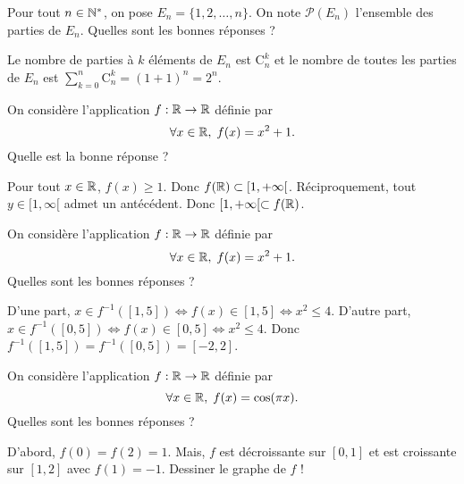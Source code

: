 \begin{question}
Pour tout $n\in \mathbb{N} ^*$, on pose $E_n=\{1,2,\dots ,n\}$. On note $\mathscr{P}(E_n)$ l'ensemble des parties de $E_n$. Quelles sont les bonnes réponses ?
\begin{answers}  
\end{answers}
\begin{explanations}
Le nombre de parties à $k$ éléments de $E_n$ est $\mathrm{C}^k_n$ et le nombre de toutes les parties de $E_n$ est $\displaystyle \sum _{k=0}^n\mathrm{C}^k_n=(1+1)^n=2^n$.
\end{explanations}
\end{question}


\begin{question}
On considère l'application $f:\mathbb{R}\to \mathbb{R}$ définie par
$$\forall x\in \mathbb{R},\; f(x)=x^2+1.$$
Quelle est la bonne réponse ?
\begin{answers}  
    \bad{$f(\Rr)=[0,+\infty [$}
    \bad{$f(\Rr)=]1,+\infty [$}
    \good{$f(\Rr)=[1,+\infty [$}
\end{answers}
\begin{explanations}
Pour tout $x\in \mathbb{R}$, $f(x)\geq 1$. Donc $f(\mathbb{R})\subset [1,+\infty[$. Réciproquement, tout $y\in [1,\infty [$ admet un antécédent. Donc $[1,+\infty[ \subset f(\mathbb{R})$.
\end{explanations}
\end{question}


\begin{question}
On considère l'application $f:\mathbb{R}\to \mathbb{R}$ définie par
$$\forall x\in \mathbb{R},\; f(x)=x^2+1.$$
Quelles sont les bonnes réponses ?
\begin{answers}  
\end{answers}
\begin{explanations}
D'une part, $x\in f^{-1}([1,5])\Leftrightarrow f(x)\in [1,5]\Leftrightarrow x^2\leq 4$. D'autre part, $x\in f^{-1}([0,5])\Leftrightarrow f(x)\in [0,5]\Leftrightarrow x^2\leq 4$. Donc $f^{-1}([1,5])=f^{-1}([0,5])=[-2,2]$.
\end{explanations}
\end{question}


\begin{question}
On considère l'application $f:\mathbb{R}\to \mathbb{R}$ définie par
$$\forall x\in \mathbb{R},\; f(x)=\cos (\pi x).$$
Quelles sont les bonnes réponses ?
\begin{answers}  
\end{answers}
\begin{explanations}
D'abord, $f(0)=f(2)=1$. Mais, $f$ est décroissante sur $[0,1]$ et est croissante sur $[1,2]$ avec $f(1)=-1$. Dessiner le graphe de $f$ !
\end{explanations}
\end{question}


